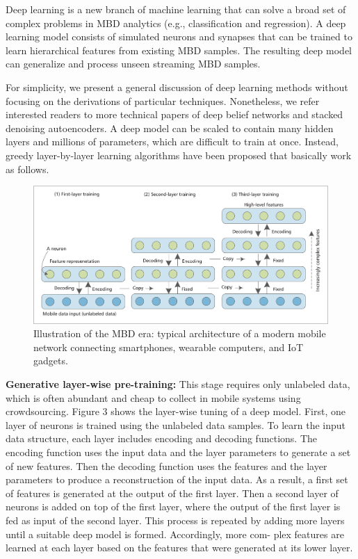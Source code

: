 \documentclass[14pt, a4paper]{extarticle}
\begin{document}
Deep learning is a new branch of machine learning that can
solve a broad set of complex problems in MBD analytics (e.g.,
classification and regression). A deep learning model consists of
simulated neurons and synapses that can be trained to learn
hierarchical features from existing MBD samples. The resulting deep model can generalize and process unseen streaming
MBD samples.

For simplicity, we present a general discussion of deep
learning methods without focusing on the derivations of particular techniques. Nonetheless, we refer interested readers to
more technical papers of deep belief networks and stacked
denoising autoencoders. A deep model can be scaled to
contain many hidden layers and millions of parameters, which
are difficult to train at once. Instead, greedy layer-by-layer
learning algorithms have been proposed that basically
work as follows.

\begin{figure}[!h]
	\centering
    \includegraphics[width=.8\linewidth]{deep_learning.png}
    \caption{Illustration of the MBD era: typical architecture of a modern mobile network connecting smartphones, wearable
computers, and IoT gadgets.}
\end{figure}


\textbf{Generative layer-wise pre-training:} This stage requires only
unlabeled data, which is often abundant and cheap to collect
in mobile systems using crowdsourcing. Figure 3 shows the
layer-wise tuning of a deep model. First, one layer of neurons
is trained using the unlabeled data samples. To learn the input
data structure, each layer includes encoding and decoding
functions. The encoding function uses the input data and the
layer parameters to generate a set of new features. Then the
decoding function uses the features and the layer parameters
to produce a reconstruction of the input data. As a result, a
first set of features is generated at the output of the first layer.
Then a second layer of neurons is added on top of the first
layer, where the output of the first layer is fed as input of the
second layer. This process is repeated by adding more layers
until a suitable deep model is formed. Accordingly, more com-
plex features are learned at each layer based on the features
that were generated at its lower layer.
\end{document}

